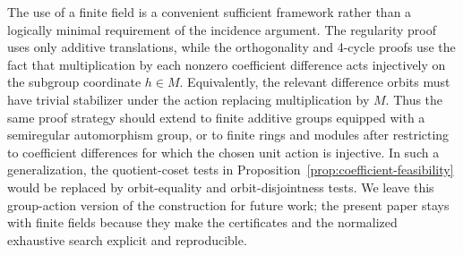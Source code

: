 \documentclass[11pt,a4paper]{article}
\theoremstyle{uprighttheorem}
\begin{document}
The use of a finite field is a convenient sufficient framework rather than a logically minimal requirement of the incidence argument.
The regularity proof uses only additive translations, while the orthogonality and 4-cycle proofs use the fact that multiplication by each nonzero coefficient difference acts injectively on the subgroup coordinate \(h\in M\).
Equivalently, the relevant difference orbits must have trivial stabilizer under the action replacing multiplication by \(M\).
Thus the same proof strategy should extend to finite additive groups equipped with a semiregular automorphism group, or to finite rings and modules after restricting to coefficient differences for which the chosen unit action is injective.
In such a generalization, the quotient-coset tests in Proposition~\ref{prop:coefficient-feasibility} would be replaced by orbit-equality and orbit-disjointness tests.
We leave this group-action version of the construction for future work; the present paper stays with finite fields because they make the certificates and the normalized exhaustive search explicit and reproducible.
\end{document}
